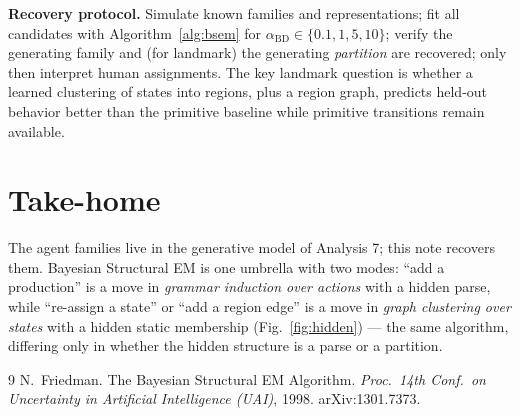 \documentclass[10pt]{article}
\begin{document}
\textbf{Recovery protocol.} Simulate known families and representations; fit all candidates
with Algorithm~\ref{alg:bsem} for $\alpha_{\mathrm{BD}}\in\{0.1,1,5,10\}$; verify the
generating family and (for landmark) the generating \emph{partition} are recovered; only then
interpret human assignments. The key landmark question is whether a learned clustering of
states into regions, plus a region graph, predicts held-out behavior better than the
primitive baseline while primitive transitions remain available.

\section{Take-home}

The agent families live in the generative model of Analysis 7; this note recovers them.
Bayesian Structural EM is one umbrella with two modes: ``add a production'' is a move in
\emph{grammar induction over actions} with a hidden parse, while ``re-assign a state'' or
``add a region edge'' is a move in \emph{graph clustering over states} with a hidden static
membership (Fig.~\ref{fig:hidden}) --- the same algorithm, differing only in whether the
hidden structure is a parse or a partition.

\begin{thebibliography}{9}
 N.\ Friedman. The Bayesian Structural EM Algorithm.
\emph{Proc.\ 14th Conf.\ on Uncertainty in Artificial Intelligence (UAI)}, 1998. arXiv:1301.7373.
\end{thebibliography}
\end{document}
